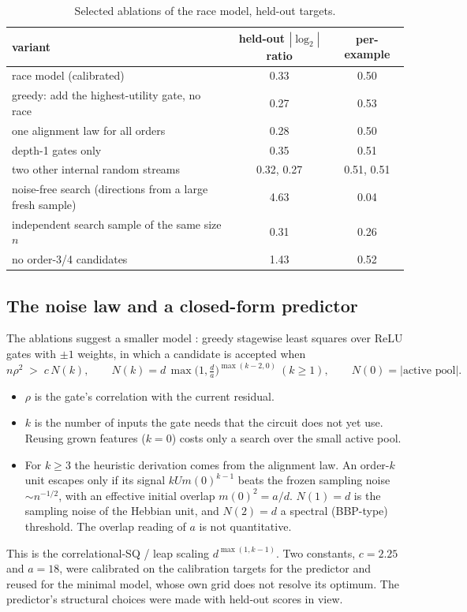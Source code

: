 \begin{table}[t]
\centering\footnotesize\setlength{\tabcolsep}{4pt}
\begin{tabular}{lcc}
\toprule
variant & held-out $|\log_2|$ ratio & per-example\\
\midrule
race model (calibrated) & 0.33 & 0.50\\
greedy: add the highest-utility gate, no race & 0.27 & 0.53\\
one alignment law for all orders & 0.28 & 0.50\\
depth-1 gates only & 0.35 & 0.51\\
two other internal random streams & 0.32, 0.27 & 0.51, 0.51\\
\midrule
noise-free search (directions from a large fresh sample) & 4.63 & 0.04\\
independent search sample of the same size $n$ & 0.31 & 0.26\\
no order-3/4 candidates & 1.43 & 0.52\\
\bottomrule
\end{tabular}
\caption{Selected ablations of the race model, held-out targets.}
\label{tab:ablations}
\end{table}

\subsection{The noise law and a closed-form predictor}\label{sec:noiselaw}

The ablations suggest a smaller model : greedy stagewise least squares over ReLU gates with $\pm1$ weights, in which a candidate is accepted when
\begin{equation}\label{eq:noiselaw}
n\rho^2 \;>\; c\,N(k),\qquad N(k)=d\,\max\!\bigl(1,\tfrac da\bigr)^{\max(k-2,0)}\ (k\ge1),\qquad N(0)=|\text{active pool}|.
\end{equation}
\begin{itemize}
\item $\rho$ is the gate's correlation with the current residual.
\item $k$ is the number of inputs the gate needs that the circuit does not yet use. Reusing grown features ($k=0$) costs only a search over the small active pool.
\item For $k\ge3$ the heuristic derivation comes from the alignment law. An order-$k$ unit escapes only if its signal $kU m(0)^{k-1}$ beats the frozen sampling noise $\sim n^{-1/2}$, with an effective initial overlap $m(0)^2=a/d$. $N(1)=d$ is the sampling noise of the Hebbian unit, and $N(2)=d$ a spectral (BBP-type) threshold. The overlap reading of $a$ is not quantitative.
\end{itemize}
This is the correlational-SQ / leap scaling $d^{\max(1,k-1)}$. Two constants, $c=2.25$ and $a=18$, were calibrated on the calibration targets for the predictor and reused for the minimal model, whose own grid does not resolve its optimum. The predictor's structural choices were made with held-out scores in view.

